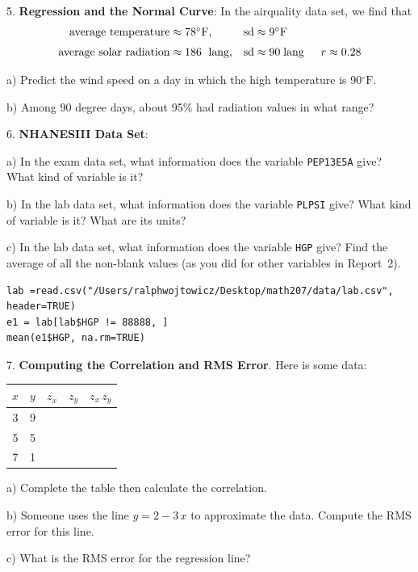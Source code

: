 \documentclass[10pt]{article}
\begin{document}
5. \textbf{Regression and the Normal Curve}: In the airquality data set, we find that\vspace{-5pt}
\begin{align*}
\mbox{average temperature}   & \approx \mbox{$78^{\circ}\mbox{F}$,}    & \mbox{sd} & \approx \mbox{$9^{\circ}\mbox{F}$}\\[3pt]
\mbox{average solar radiation}  & \approx \mbox{186\; lang,}  & \mbox{sd} & \approx 90\; \mbox{lang}
   \hspace{15pt} r\approx 0.28
\end{align*}\vspace{-20pt}

\hspace{10pt} a) Predict the wind speed on a day in which the high temperature is 90$^{\circ}\mbox{F}$.
\vspace{.5in}

\hspace{10pt} b) Among 90 degree days, about 95\% had radiation values in what range?
\vspace{1in}

6. \textbf{NHANESIII Data Set}:

\hspace{10pt} a) In the exam data set, what information does the variable \texttt{PEP13E5A} give?
What kind of variable is it?
\vspace{.25in}


\hspace{10pt} b) In the lab data set, what information does the variable \texttt{PLPSI} give?
What kind of variable is it?  What are its units?
\vspace{.4in}

\hspace{10pt} c) In the lab data set, what information does the variable \texttt{HGP} give?
Find the average of all the non-blank values (as you did for other variables in Report~2).

{\color{blue}\begin{verbatim}
lab =read.csv("/Users/ralphwojtowicz/Desktop/math207/data/lab.csv", header=TRUE)
e1 = lab[lab$HGP != 88888, ]
mean(e1$HGP, na.rm=TRUE)
\end{verbatim}}

\vfill
\eject
    
7. \textbf{Computing the Correlation and RMS Error}.
Here is some data:
\begin{center}
{\setlength{\tabcolsep}{40pt}\begin{tabular}{cc|cc|c}
$x$ & $y$ & $z_x$ & $z_y$ & $z_x\,z_y$\\[2pt]\hline
3   & 9 & & &\vphantom{\LARGE Y}\\[20pt]
5   & 5 & & & \\[20pt]
7   & 1 & & &\\[20pt]
\end{tabular}}
\end{center}
\hspace{10pt} a) Complete the table then calculate the correlation.
\vspace{1.5in}

\hspace{10pt} b) Someone uses the line $y=2 - 3\,x$ to approximate the data.
Compute the RMS error for this line.
\vspace{1.5in}

\hspace{10pt} c) What is the RMS error for the regression line?


\vfill
\eject
\end{document}
